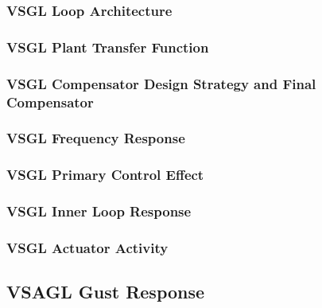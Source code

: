 \subsubsection{VSGL Loop Architecture}

\subsubsection{VSGL Plant Transfer Function}

\subsubsection{VSGL Compensator Design Strategy and Final Compensator}

\subsubsection{VSGL Frequency Response}

\subsubsection{VSGL Primary Control Effect}


\subsubsection{VSGL Inner Loop Response}


\subsubsection{VSGL Actuator Activity}


\subsection{VSAGL Gust Response}

